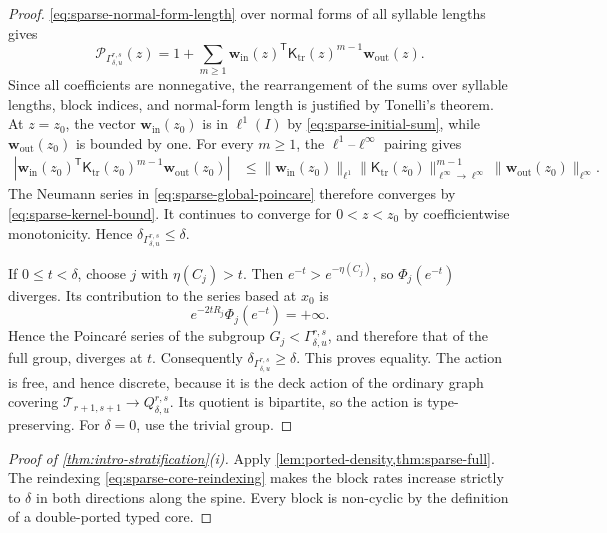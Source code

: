 \documentclass[11pt]{amsart}
\theoremstyle{plain}
\theoremstyle{definition}
\theoremstyle{remark}
\newcommand{\T}{\mathcal T}
\begin{document}
\begin{proof}
\eqref{eq:sparse-normal-form-length} over normal forms of all syllable
lengths gives
\begin{equation}\label{eq:sparse-global-poincare}
  \mathcal P_{\Gamma_{\delta,u}^{r,s}}(z)
  =1+\sum_{m\geq1}
    \mathbf w_{\mathrm{in}}(z)^{\mathsf T}
    \mathsf K_{\mathrm{tr}}(z)^{m-1}\mathbf w_{\mathrm{out}}(z).
\end{equation}
Since all coefficients are nonnegative, the rearrangement of the sums over syllable lengths, block indices, and normal-form length is justified by Tonelli’s theorem.
At \(z=z_0\), the vector \(\mathbf w_{\mathrm{in}}(z_0)\) is in
\(\ell^1(I)\) by \eqref{eq:sparse-initial-sum}, while
\(\mathbf w_{\mathrm{out}}(z_0)\) is bounded by one.
For every \(m\geq1\), the \(\ell^1\)--\(\ell^\infty\) pairing gives
\begin{align*}
  \left|
  \mathbf w_{\mathrm{in}}(z_0)^{\mathsf T}
  \mathsf K_{\mathrm{tr}}(z_0)^{m-1}
  \mathbf w_{\mathrm{out}}(z_0)
  \right|
  &\leq
  \|\mathbf w_{\mathrm{in}}(z_0)\|_{\ell^1}
  \|\mathsf K_{\mathrm{tr}}(z_0)\|_{\ell^\infty\to\ell^\infty}^{m-1}
  \|\mathbf w_{\mathrm{out}}(z_0)\|_{\ell^\infty}.
\end{align*}
The Neumann series in \eqref{eq:sparse-global-poincare} therefore converges
by \eqref{eq:sparse-kernel-bound}.  It continues to converge for
\(0<z<z_0\) by coefficientwise monotonicity.  Hence
\(\delta_{\Gamma_{\delta,u}^{r,s}}\leq\delta\).

If \(0\leq t<\delta\), choose \(j\) with \(\eta(C_j)>t\).  Then
\(e^{-t}>e^{-\eta(C_j)}\), so \(\Phi_j(e^{-t})\) diverges.  Its contribution
to the series based at \(x_0\) is
\[
  e^{-2tR_j}\Phi_j(e^{-t})=+\infty.
\]
Hence the Poincar\'e series of the subgroup
\(G_j<\Gamma_{\delta,u}^{r,s}\), and therefore that of the full group,
diverges at \(t\).  Consequently
\(\delta_{\Gamma_{\delta,u}^{r,s}}\geq\delta\).  This proves equality.
The action is free, and hence discrete, because it is the deck action of the
ordinary graph covering
\(\T_{r+1,s+1}\to Q_{\delta,u}^{r,s}\).  Its quotient is bipartite, so the
action is type-preserving.  For \(\delta=0\), use the trivial group.
\end{proof}

\begin{proof}[Proof of \cref{thm:intro-stratification}\textup{(i)}]
Apply \cref{lem:ported-density,thm:sparse-full}.  The reindexing
\eqref{eq:sparse-core-reindexing} makes the block rates increase strictly to
\(\delta\) in both directions along the spine.  Every block is non-cyclic by
the definition of a double-ported typed core.
\end{proof}
\end{document}
